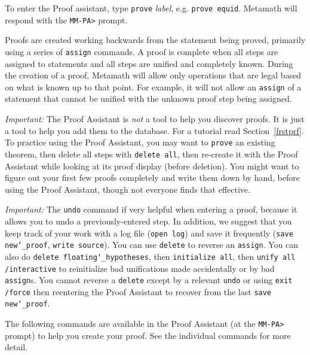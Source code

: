 To enter the Proof assistant, type \texttt{prove} {\em label}, e.g.
\texttt{prove equid}.  Metamath will respond with the \texttt{MM-PA>}
prompt.

Proofs are created working backwards from the statement being proved,
primarily using a series of \texttt{assign} commands.  A proof is
complete when all steps are assigned to statements and all steps are
unified and completely known.  During the creation of a proof, Metamath
will allow only operations that are legal based on what is known up to
that point.  For example, it will not allow an \texttt{assign} of a
statement that cannot be unified with the unknown proof step being
assigned.

{\em Important:}
The Proof Assistant is
{\em not} a tool to help you discover proofs.  It is just a tool to help
you add them to the database.  For a tutorial read
Section~\ref{frstprf}.
To practice using the Proof Assistant, you may
want to \texttt{prove} an existing theorem, then delete all steps with
\texttt{delete all}, then re-create it with the Proof Assistant while
looking at its proof display (before deletion).
You might want to figure out your first few proofs completely
and write them down by hand, before using the Proof Assistant, though
not everyone finds that effective.

{\em Important:}
The \texttt{undo} command if very helpful when entering a proof, because
it allows you to undo a previously-entered step.
In addition, we suggest that you
keep track of your work with a log file (\texttt{open
log}) and save it frequently (\texttt{save new{\char`\_}proof},
\texttt{write source}).
You can use \texttt{delete} to reverse an \texttt{assign}.
You can also do \texttt{delete floating{\char`\_}hypotheses}, then
\texttt{initialize all}, then \texttt{unify all /interactive} to
reinitialize bad unifications made accidentally or by bad
\texttt{assign}s.  You cannot reverse a \texttt{delete} except by
a relevant \texttt{undo} or using
\texttt{exit /force} then reentering the Proof Assistant to recover from
the last \texttt{save new{\char`\_}proof}.

The following commands are available in the Proof Assistant (at the
\texttt{MM-PA>} prompt) to help you create your proof.  See the
individual commands for more detail.

